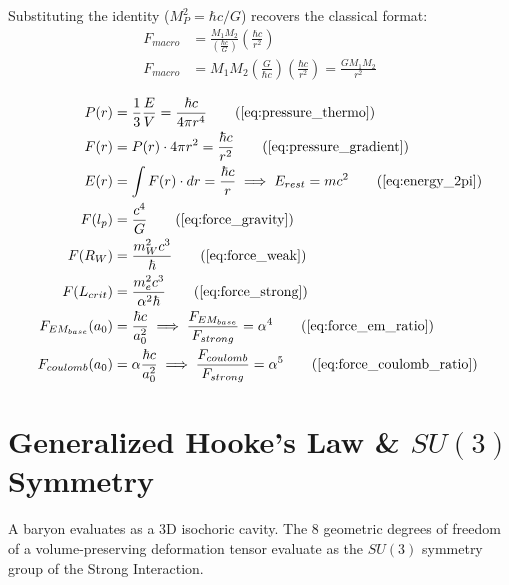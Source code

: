 Substituting the identity ($M_P^2 = \hbar c / G$) recovers the classical format:
\begin{align}
    F_{macro} &= \frac{M_1 M_2}{\left( \frac{\hbar c}{G} \right)} \left( \frac{\hbar c}{r^2} \right) \nonumber \\
    F_{macro} &= M_1 M_2 \left( \frac{G}{\hbar c} \right) \left( \frac{\hbar c}{r^2} \right) = \frac{G M_1 M_2}{r^2}
\end{align}


\begin{tcolorbox}[recallbox, title={\ref{box:pressure_gradient}. Continuous Pressure Dynamics}]
\begin{align}
    P(r) &= \frac{1}{3} \frac{E}{V} = \frac{\hbar c}{4\pi r^4} \tag{\ref{eq:pressure_thermo}} \\
    F(r) &= P(r) \cdot 4\pi r^2 = \frac{\hbar c}{r^2} \tag{\ref{eq:pressure_gradient}} \\
    E(r) &= \int F(r) \cdot dr = \frac{\hbar c}{r} \implies E_{rest} = mc^2 \tag{\ref{eq:energy_2pi}} \\
    F(l_p) &= \frac{c^4}{G} \tag{\ref{eq:force_gravity}} \\
    F(R_W) &= \frac{m_W^2 c^3}{\hbar} \tag{\ref{eq:force_weak}} \\
    F(L_{crit}) &= \frac{m_e^2 c^3}{\alpha^2 \hbar} \tag{\ref{eq:force_strong}} \\
    F_{EM_{base}}(a_0) &= \frac{\hbar c}{a_0^2} \implies \frac{F_{EM_{base}}}{F_{strong}} = \alpha^4 \tag{\ref{eq:force_em_ratio}} \\
    F_{coulomb}(a_0) &= \alpha \frac{\hbar c}{a_0^2} \implies \frac{F_{coulomb}}{F_{strong}} = \alpha^5 \tag{\ref{eq:force_coulomb_ratio}}
\end{align}
\end{tcolorbox}

\section{Generalized Hooke's Law \& $SU(3)$ Symmetry}
\label{sec:deriv_hookes_su3}

A baryon evaluates as a 3D isochoric cavity. The 8 geometric degrees of freedom of a volume-preserving deformation tensor evaluate as the $SU(3)$ symmetry group of the Strong Interaction.

\vspace{0.2 cm}

